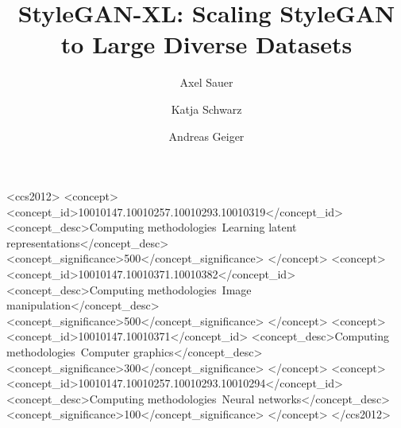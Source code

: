 \documentclass[acmtog,screen]{acmart}
\begin{document}
\title{StyleGAN-XL: Scaling StyleGAN to Large Diverse Datasets}

\author{Axel Sauer}


\author{Katja Schwarz}


\author{Andreas Geiger}

\renewcommand\shortauthors{Sauer et al.}

 

\begin{CCSXML}
<ccs2012>
  <concept>
      <concept_id>10010147.10010257.10010293.10010319</concept_id>
      <concept_desc>Computing methodologies~Learning latent representations</concept_desc>
      <concept_significance>500</concept_significance>
      </concept>
  <concept>
      <concept_id>10010147.10010371.10010382</concept_id>
      <concept_desc>Computing methodologies~Image manipulation</concept_desc>
      <concept_significance>500</concept_significance>
      </concept>
  <concept>
      <concept_id>10010147.10010371</concept_id>
      <concept_desc>Computing methodologies~Computer graphics</concept_desc>
      <concept_significance>300</concept_significance>
      </concept>
  <concept>
      <concept_id>10010147.10010257.10010293.10010294</concept_id>
      <concept_desc>Computing methodologies~Neural networks</concept_desc>
      <concept_significance>100</concept_significance>
      </concept>
 </ccs2012>
\end{CCSXML}


\teaser



\maketitle





 
\end{document}
